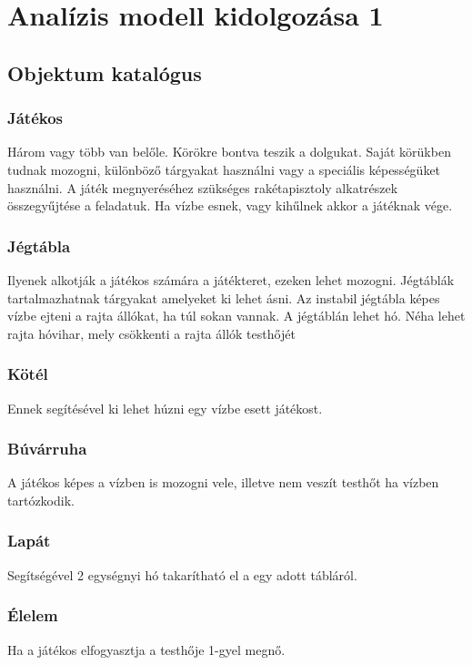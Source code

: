 %
\chapter{Analízis modell kidolgozása 1}

\thispagestyle{fancy}

\section{Objektum katalógus}

\subsection{Játékos}
Három vagy több van belőle. Körökre bontva teszik a dolgukat. Saját körükben tudnak mozogni, különböző tárgyakat használni vagy a speciális képességüket használni. A játék megnyeréséhez szükséges rakétapisztoly alkatrészek összegyűjtése a feladatuk. Ha vízbe esnek, vagy kihűlnek akkor a játéknak vége.

\subsection{Jégtábla}
Ilyenek alkotják a játékos számára a játékteret, ezeken lehet mozogni. Jégtáblák tartalmazhatnak tárgyakat amelyeket ki lehet ásni. Az instabil jégtábla képes vízbe ejteni a rajta állókat, ha túl sokan vannak. A jégtáblán lehet hó. Néha lehet rajta hóvihar, mely csökkenti a rajta állók testhőjét

\subsection{Kötél}
Ennek segítésével ki lehet húzni egy vízbe esett játékost.

\subsection{Búvárruha}
A játékos képes a vízben is mozogni vele, illetve nem veszít testhőt ha vízben tartózkodik.

\subsection{Lapát}
Segítségével 2 egységnyi hó takarítható el a egy adott tábláról.

\subsection{Élelem}
Ha a játékos elfogyasztja a testhője 1-gyel megnő.

